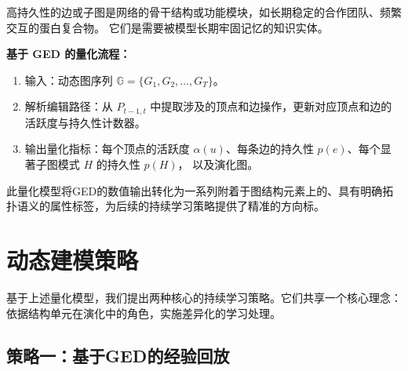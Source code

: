 高持久性的边或子图是网络的骨干结构或功能模块，如长期稳定的合作团队、频繁交互的蛋白复合物。
它们是需要被模型长期牢固记忆的知识实体。

\textbf{基于 GED 的量化流程：}
\begin{enumerate}[label=\arabic*.]
  \item 输入：动态图序列 $\mathbb{G}=\{G_1,G_2,\dots,G_T\}$。
  \item 解析编辑路径：从 $P_{t-1,t}$ 中提取涉及的顶点和边操作，更新对应顶点和边的活跃度与持久性计数器。
  \item 输出量化指标：每个顶点的活跃度 $\alpha(u)$、每条边的持久性 $p(e)$、每个显著子图模式 $H$ 的持久性 $p(H)$，
        以及演化图。
\end{enumerate}
此量化模型将GED的数值输出转化为一系列附着于图结构元素上的、具有明确拓扑语义的属性标签，为后续的持续学习策略提供了精准的方向标。

\section{动态建模策略}
基于上述量化模型，我们提出两种核心的持续学习策略。它们共享一个核心理念：依据结构单元在演化中的角色，实施差异化的学习处理。

\subsection{策略一：基于GED的经验回放}

